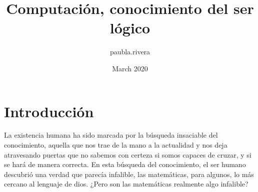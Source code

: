 \documentclass{article}
\title{Computación, conocimiento del ser lógico}
\author{paubla.rivera }
\date{March 2020}
\begin{document}
\maketitle

\section*{Introducción}
La existencia humana ha sido marcada por la búsqueda insaciable del conocimiento, aquella que nos trae de la mano a la actualidad y nos deja atravesando puertas que no sabemos con certeza si somos capaces de cruzar, y si se hará de manera correcta. En esta búsqueda del conocimiento, el ser humano descubrió una verdad que parecía infalible, las matemáticas, para algunos, lo más cercano al lenguaje de dios. ¿Pero son las matemáticas realmente algo infalible?
\end{document}
